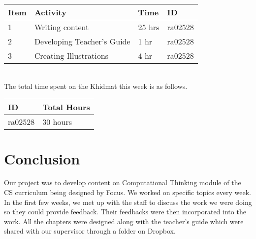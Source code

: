 \documentclass{article}
\begin{document}
\begin{tabular}{|l|l|l|l|}
  \hline
  Item 	& Activity & Time & ID \\\hline\hline
  1	& Writing content & 25 hrs & ra02528 \\\hline
  2	& Developing Teacher's Guide & 1 hr & ra02528 \\\hline
  3	& Creating Illustrations & 4 hr & ra02528 \\\hline
\end{tabular}\\

The total time spent on the Khidmat this week is as follows.

\begin{tabular}{|l|l|}
  \hline
  ID & Total Hours\\\hline\hline
  ra02528 & 30 hours\\\hline
\end{tabular}

\newpage
\section*{Conclusion}


Our project was to develop content on Computational Thinking module of the CS curriculum being designed by Focus. We worked on specific topics every week. In the first few weeks, we met up with the staff to discuss the work we were doing so they could provide feedback. Their feedbacks were then incorporated into the work. All the chapters were designed along with the teacher's guide which were shared with our supervisor through a folder on Dropbox.

\newpage
\thispagestyle{empty}
\end{document}
